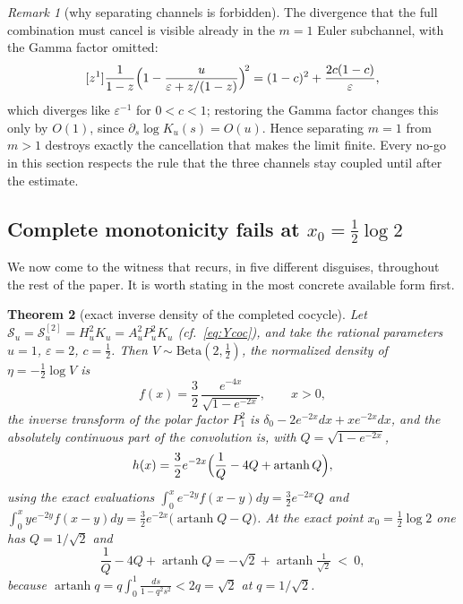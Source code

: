 \documentclass[11pt]{amsart}
\newtheorem{theorem}{Theorem}[section]
\theoremstyle{definition}
\theoremstyle{remark}
\newtheorem{remark}[theorem]{Remark}
\theoremstyle{definition}
\newcommand{\eps}{\varepsilon}
\newcommand{\artanh}{\operatorname{artanh}}
\begin{document}
\begin{remark}[why separating channels is forbidden]\label{rmk:no-split}
The divergence that the full combination must cancel is visible already in the $m=1$ Euler
subchannel, with the Gamma factor omitted:
\begin{equation}\label{eq:m1-divergence}
   [z^1]\frac{1}{1-z}\Bigl(1-\frac{u}{\eps+z/(1-z)}\Bigr)^{\!2}
   =(1-c)^2+\frac{2c(1-c)}{\eps},
\end{equation}
which diverges like $\eps^{-1}$ for $0<c<1$; restoring the Gamma factor changes this only by
$O(1)$, since $\partial_s\log K_u(s)=O(u)$. Hence separating $m=1$ from $m>1$ destroys exactly
the cancellation that makes the limit finite. Every no-go in this section respects the rule that
the three channels stay coupled until after the estimate.
\end{remark}

\subsection{Complete monotonicity fails at $x_0=\tfrac12\log2$}\label{sec:cm}

We now come to the witness that recurs, in five different disguises, throughout the rest of the
paper. It is worth stating in the most concrete available form first.

\begin{theorem}[exact inverse density of the completed cocycle]\label{thm:cm}
Let $\mathcal S_u=\mathcal S_u^{[2]}=H_u^2K_u=A_u^2P_u^2K_u$ \textup{(}cf.\ \eqref{eq:Ycoc}\textup{)}, and take the rational parameters $u=1$, $\eps=2$, $c=\tfrac12$. Then
$V\sim\mathrm{Beta}(2,\tfrac12)$, the normalized density of $\eta=-\tfrac12\log V$ is
\begin{equation}\label{eq:beta-density}
   f(x)=\frac32\,\frac{e^{-4x}}{\sqrt{1-e^{-2x}}},\qquad x>0 ,
\end{equation}
the inverse transform of the polar factor $P_1^2$ is $\delta_0-2e^{-2x}dx+xe^{-2x}dx$, and the
absolutely continuous part of the convolution is, with $Q=\sqrt{1-e^{-2x}}$,
\begin{equation}\label{eq:h-exact}
   h(x)=\frac32e^{-2x}\Bigl(\frac1Q-4Q+\artanh Q\Bigr),
\end{equation}
using the exact evaluations
$\int_0^xe^{-2y}f(x-y)dy=\tfrac32e^{-2x}Q$ and
$\int_0^xye^{-2y}f(x-y)dy=\tfrac32e^{-2x}\bigl(\artanh Q-Q\bigr)$.
At the exact point $x_0=\tfrac12\log2$ one has $Q=1/\sqrt2$ and
\begin{equation}\label{eq:cm-witness}
   \frac1Q-4Q+\artanh Q=-\sqrt2+\artanh\tfrac1{\sqrt2}\ <\ 0 ,
\end{equation}
because $\artanh q=q\int_0^1\frac{ds}{1-q^2s^2}<2q=\sqrt2$ at $q=1/\sqrt2$.
\end{theorem}
\end{document}
